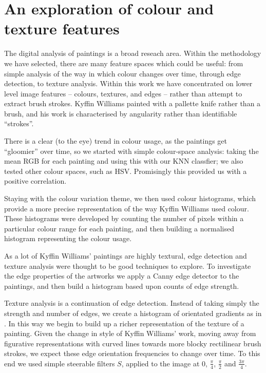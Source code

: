 \documentclass[conference,a4paper]{IEEEtran}
\begin{document}
\section{An exploration of colour and texture features}


The digital analysis of paintings is a broad reseach area. Within the
methodology we have selected, there are many feature spaces which could be
useful: from simple analysis of the way in which colour changes over time,
through edge detection, to texture analysis. Within this work we have
concentrated on lower level image features -- colours, textures, and edges --
rather than attempt to extract brush strokes. Kyffin Williams painted with a
pallette knife rather than a brush, and his work is characterised by angularity
rather than identifiable ``strokes''.

There is a clear (to the eye) trend in colour usage, as the paintings get
``gloomier'' over time, so we started with simple colour-space analysis: taking
the mean RGB for each painting and using this with our KNN classfier; we also
tested other colour spaces, such as HSV. Promisingly this provided us with a
positive correlation. 
 
Staying with the colour variation theme, we then used colour histograms, which
provide a more precise representation of the way Kyffin Williams used colour.
These histograms were developed by counting the number of pixels within a
particular colour range for each painting, and then building a normalised
histogram representing the colour usage.
 
As a lot of Kyffin Williams' paintings are highly textural, edge detection and
texture analysis were thought to be good techniques to explore.  To investigate the edge properties of the artworks we apply a Canny \cite{Canny1986Computational} edge detector to the paintings, and then build a histogram based upon counts of edge strength.

Texture analysis is a continuation of edge detection. Instead of taking simply
the strength and number of edges, we create a histogram of orientated gradients
as in \cite{Dalal2005Histograms}. In this way we begin to build up a richer
representation of the texture of a painting. Given the change in style of
Kyffin Williams' work, moving away from figurative representations with curved
lines towards more blocky rectilinear brush strokes, we expect these edge
orientation frequencies to change over time. To this end we used simple
steerable filters $S$, applied to the image at $0$, $\frac{\pi}{4}$,
$\frac{\pi}{2}$ and $\frac{3\pi}{4}$. 
\end{document}

